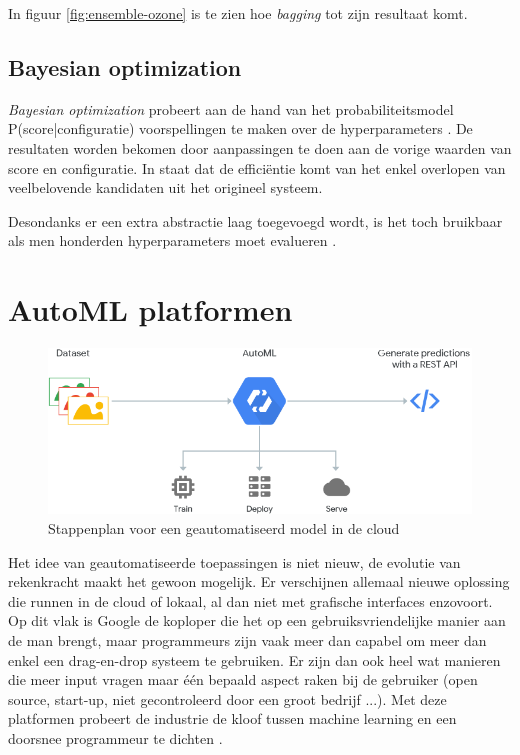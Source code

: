 In figuur \ref{fig:ensemble-ozone} is te zien hoe \textit{bagging} tot zijn resultaat komt.

\subsection{Bayesian optimization}
\label{subsec:bayesian}

\textit{Bayesian optimization} probeert aan de hand van het probabiliteitsmodel P(score|configuratie) voorspellingen te maken over de hyperparameters \autocite{Bergstra2013}. De resultaten worden bekomen door aanpassingen te doen aan de vorige waarden van score en configuratie. In \textcite{Bergstra2013} staat dat de efficiëntie komt van het enkel overlopen van veelbelovende kandidaten uit het origineel systeem.

Desondanks er een extra abstractie laag toegevoegd wordt, is het toch bruikbaar als men honderden hyperparameters moet evalueren \autocite{Bergstra2013}.

\section{AutoML platformen}
\label{sec:automl-platformen}

\begin{figure}
    \includegraphics[width=\linewidth]{img/google-cloud-automl.png}
    \caption{Stappenplan voor een geautomatiseerd model in de cloud \autocite{Google2019}}
    \label{fig:google-cloud-automl}
\end{figure}

Het idee van geautomatiseerde toepassingen is niet nieuw, de evolutie van rekenkracht maakt het gewoon mogelijk. Er verschijnen allemaal nieuwe oplossing die runnen in de cloud of lokaal, al dan niet met grafische interfaces enzovoort. Op dit vlak is Google de koploper die het op een gebruiksvriendelijke manier aan de man brengt, maar programmeurs zijn vaak meer dan capabel om meer dan enkel een drag-en-drop systeem te gebruiken. Er zijn dan ook heel wat manieren die meer input vragen maar één bepaald aspect raken bij de gebruiker (open source, start-up, niet gecontroleerd door een groot bedrijf ...). Met deze platformen probeert de industrie de kloof tussen machine learning en een doorsnee programmeur te dichten \autocite{Gutierrez2019}.

